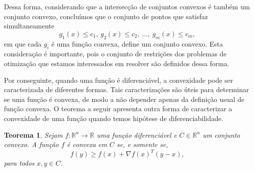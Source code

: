 \documentclass[12pt,a4paper]{scrartcl}
\def\RR{\mathds{R}}
\newtheorem{teo}{Teorema}
\theoremstyle{definition}%
\begin{document}
Dessa forma, considerando que a intersecção de conjuntos convexos é também um conjunto convexo, concluímos que o conjunto de pontos que satisfaz simultaneamente
\[
g_{1}(x) \leq c_{1}, \ g_{2}(x) \leq c_{2}, \ \ldots, \ g_{m}(x) \leq c_{m} ,
\]
em que cada $g_{i}$ é uma função convexa, define um conjunto convexo. Esta consideração é importante, pois o conjunto de restrições dos problemas de otimização que estamos interessados em resolver são definidos dessa forma. 

Por conseguinte, quando uma função é diferenciável, a convexidade pode ser caracterizada de diferentes formas. Tais caracterizações são úteis para determinar se uma função é convexa, de modo a não depender apenas da definição usual de função convexa. O teorema a seguir apresenta outra forma de caracterizar a convexidade de uma função quando temos hipótese de diferenciabilidade.

\begin{teo}  \label{teo:diferenciabilidade_e_convexidade}
Sejam $f: \RR^{n} \rightarrow \RR $ uma função diferenciável e $C \in \RR^{n}$ um conjunto convexo. A função $f$ é convexa em $C$ se, e somente se, 
\[
f(y) \geq f(x) + \nabla f(x)^{T}(y-x),
\]
para todos $x, y \in C$.
\end{teo}
\end{document}
